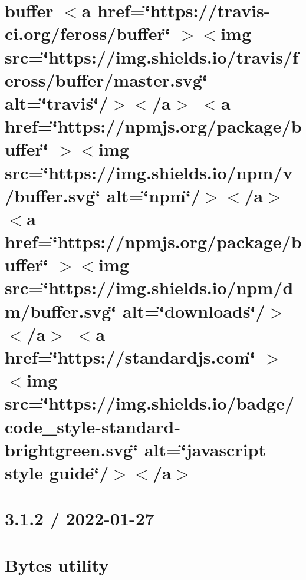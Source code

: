 \documentclass[twoside]{book}
\newcommand{\+}{\discretionary{\mbox{\scriptsize$\hookleftarrow$}}{}{}}
\begin{document}
\chapter{buffer \texorpdfstring{$<$}{<}a href=\char`\"{}https\+://travis-\/ci.\+org/feross/buffer\char`\"{} \texorpdfstring{$>$}{>}\texorpdfstring{$<$}{<}img src=\char`\"{}https\+://img.\+shields.\+io/travis/feross/buffer/master.\+svg\char`\"{} alt=\char`\"{}travis\char`\"{}/\texorpdfstring{$>$}{>}\texorpdfstring{$<$}{<}/a\texorpdfstring{$>$}{>} \texorpdfstring{$<$}{<}a href=\char`\"{}https\+://npmjs.\+org/package/buffer\char`\"{} \texorpdfstring{$>$}{>}\texorpdfstring{$<$}{<}img src=\char`\"{}https\+://img.\+shields.\+io/npm/v/buffer.\+svg\char`\"{} alt=\char`\"{}npm\char`\"{}/\texorpdfstring{$>$}{>}\texorpdfstring{$<$}{<}/a\texorpdfstring{$>$}{>} \texorpdfstring{$<$}{<}a href=\char`\"{}https\+://npmjs.\+org/package/buffer\char`\"{} \texorpdfstring{$>$}{>}\texorpdfstring{$<$}{<}img src=\char`\"{}https\+://img.\+shields.\+io/npm/dm/buffer.\+svg\char`\"{} alt=\char`\"{}downloads\char`\"{}/\texorpdfstring{$>$}{>}\texorpdfstring{$<$}{<}/a\texorpdfstring{$>$}{>} \texorpdfstring{$<$}{<}a href=\char`\"{}https\+://standardjs.\+com\char`\"{} \texorpdfstring{$>$}{>}\texorpdfstring{$<$}{<}img src=\char`\"{}https\+://img.\+shields.\+io/badge/code\+\_\+style-\/standard-\/brightgreen.\+svg\char`\"{} alt=\char`\"{}javascript style guide\char`\"{}/\texorpdfstring{$>$}{>}\texorpdfstring{$<$}{<}/a\texorpdfstring{$>$}{>}}
\label{md__c___users_vaishnavi_jadhav__desktop__developer_code_mean_stack_example_server_node_modules_buffer__r_e_a_d_m_e}

\chapter{3.1.2 / 2022-\/01-\/27}
\label{md__c___users_vaishnavi_jadhav__desktop__developer_code_mean_stack_example_server_node_modules_bytes__history}

\chapter{Bytes utility}
\label{md__c___users_vaishnavi_jadhav__desktop__developer_code_mean_stack_example_server_node_modules_bytes__readme}

\end{document}
